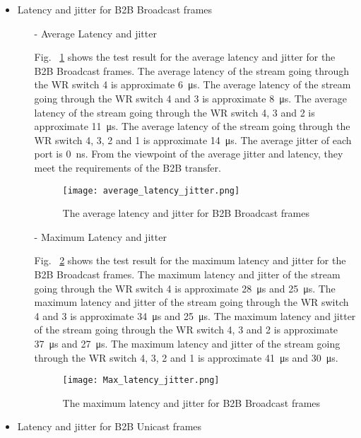 \begin{itemize}
    \item Latency and jitter for B2B Broadcast frames
		\begin{itemize}
    		\item[-] Average Latency and jitter

Fig. ~\ref{average_latency_jitter} shows the test result for the average latency and jitter for the B2B Broadcast frames. The average latency of the stream going through the WR switch 4 is approximate \SI{6}{\us}. The average latency of the stream going through the WR switch 4 and 3 is approximate \SI{8}{\us}. The average latency of the stream going through the WR switch 4, 3 and 2 is approximate \SI{11}{\us}. The average latency of the stream going through the WR switch 4, 3, 2 and 1 is approximate \SI{14}{\us}. The average jitter of each port is \SI{0}{\ns}. From the viewpoint of the average jitter and latency, they meet the requirements of the B2B transfer.  

\begin{figure}[H]
   \centering   
   \texttt{[image: average\_latency\_jitter.png]}
   \caption{The average latency and jitter for B2B Broadcast frames}
   \label{average_latency_jitter}
\end{figure}

			\item[-] Maximum Latency and jitter

Fig. ~\ref{Max_latency_jitter} shows the test result for the maximum latency and jitter for the B2B Broadcast frames. The maximum latency and jitter of the stream going through the WR switch 4 is approximate \SI{28}{\us} and \SI{25}{\us}. The maximum latency and jitter of the stream going through the WR switch 4 and 3 is approximate \SI{34}{\us} and \SI{25}{\us}. The maximum latency and jitter of the stream going through the WR switch 4, 3 and 2 is approximate \SI{37}{\us} and \SI{27}{\us}. The maximum latency and jitter of the stream going through the WR switch 4, 3, 2 and 1 is approximate \SI{41}{\us} and \SI{30}{\us}. 

\begin{figure}[H]
   \centering   
   \texttt{[image: Max\_latency\_jitter.png]}
   \caption{The maximum latency and jitter for B2B Broadcast frames}
   \label{Max_latency_jitter}
\end{figure}


		\end{itemize}
    \item Latency and jitter for B2B Unicast frames


\end{itemize}
